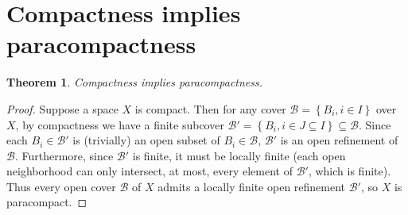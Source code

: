 \documentclass{article}
\newtheorem{theorem}[subsection]{Theorem}
\theoremstyle{definition}
\newcommand{\set}[1]{\left\{#1\right\}}
\begin{document}
\section{Compactness implies paracompactness}
\begin{theorem}
Compactness implies paracompactness.
\end{theorem}
\begin{proof}
Suppose a space $X$ is compact. Then for any cover $\mathcal{B}
=\set{B_i, i\in I}$ over $X$,
by compactness we have a finite subcover 
$\mathcal{B}'=\set{B_i, i\in J\subseteq I} \subseteq \mathcal{B}$. Since each 
$B_i \in \mathcal{B}'$ is (trivially) an open subset of $B_i \in \mathcal{B}$, 
$\mathcal{B}'$ is an open refinement of $\mathcal{B}$. Furthermore, since
$\mathcal{B}'$ is finite, it must be locally finite (each open neighborhood
can only intersect, at most, every element of $\mathcal{B}'$, which is finite). 
Thus
every open cover $\mathcal{B}$ of $X$ admits a locally finite open refinement
$\mathcal{B}'$, so $X$
is paracompact.
\end{proof}
\end{document}
